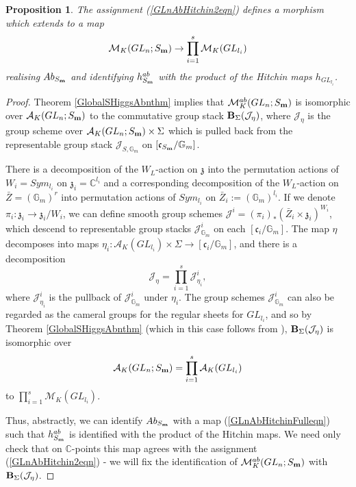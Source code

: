 \documentclass{amsart}
\newtheorem{proposition}[theorem]{Proposition}
\theoremstyle{remark}
\numberwithin{theorem}{section}
\numberwithin{equation}{section}
\begin{document}
\begin{proposition}\label{GLnAbHitchinprp}
    The assignment (\ref{GLnAbHitchin2eqn}) defines a morphism which extends to a map
    \begin{equation}\label{GLnAbHitchinFulleqn}
        \mathcal M_K(GL_n;S_{\bf m})\rightarrow \prod_{i=1}^s\mathcal M_K(GL_{l_i})
    \end{equation}
    realising $Ab_{S_{\bf m}}$ and identifying $h_{S_{\bf m}}^{ab}$ with the product of the Hitchin maps $h_{GL_{l_i}}$.
\end{proposition}

\begin{proof}
Theorem \ref{GlobalSHiggsAbnthm} implies that $\mathcal M^{ab}_K(GL_n;S_{\bf m})$ is isomorphic over $\mathcal A_K(GL_n;S_{\bf m})$ to the commutative group stack ${\bf B}_\Sigma(\mathcal J_\eta)$, where $\mathcal J_\eta$ is the group scheme over $\mathcal A_K(GL_n;S_{\bf m}) \times \Sigma$ which is pulled back from the representable group stack $\mathcal J_{S, \mathbb{G}_m}$ on $[\mathfrak{c}_{S_{\bf m}}/\mathbb{G}_m]$. 

There is a decomposition of the $W_L$-action on $\mathfrak{z}$ into the permutation actions of $W_i = Sym_{l_i}$ on $\mathfrak{z}_i = \mathbb{C}^{l_i}$ and a corresponding decomposition of the $W_L$-action on $\bar{Z} = (\mathbb{G}_m)^r$ into permutation actions of $Sym_{l_i}$ on $\bar{Z}_i := (\mathbb{G}_m)^{l_i}$. If we denote $\pi_i:\mathfrak{z}_i \rightarrow \mathfrak{z}_i/W_i$, we can define smooth group schemes $\mathcal J^i = (\pi_i)_*(\bar{Z}_i\times\mathfrak{z}_i)^{W_i}$, which descend to representable group stacks $\mathcal J^i_{\mathbb{G}_m}$ on each $[\mathfrak{c}_i/\mathbb{G}_m]$. The map $\eta$ decomposes into maps $\eta_i:\mathcal A_K(GL_{l_i}) \times \Sigma \rightarrow [\mathfrak{c}_i/\mathbb{G}_m]$, and there is a decomposition $$\mathcal J_\eta = \prod_{i=1}^s\mathcal J^i_{\eta_i},$$ where $\mathcal J^i_{\eta_i}$ is the pullback of $\mathcal J^i_{\mathbb{G}_m}$ under $\eta_i$. The group schemes $\mathcal J^i_{\mathbb{G}_m}$ can also be regarded as the cameral groups for the regular sheets for $GL_{l_i}$, and so by Theorem \ref{GlobalSHiggsAbnthm} (which in this case follows from \cite[Theorem 4.4]{DG}), ${\bf B}_\Sigma(\mathcal J_\eta)$ is isomorphic over $$\mathcal A_K(GL_n;S_{\bf m}) = \prod_{i=1}^s \mathcal A_K(GL_{l_i})$$ to $\prod_{i=1}^s\mathcal M_K(GL_{l_i})$.

Thus, abstractly, we can identify $Ab_{S_{\bf m}}$ with a map (\ref{GLnAbHitchinFulleqn}) such that $h_{S_{\bf m}}^{ab}$ is identified with the product of the Hitchin maps. We need only check that on $\mathbb{C}$-points this map agrees with the assignment (\ref{GLnAbHitchin2eqn}) - we will fix the identification of $\mathcal M^{ab}_K(GL_n;S_{\bf m})$ with ${\bf B}_{\Sigma}(\mathcal J_\eta)$.


\end{proof}
\end{document}
